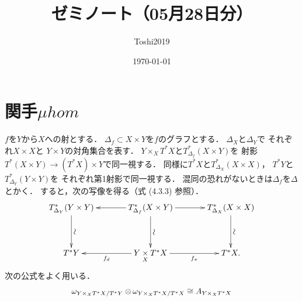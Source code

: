\documentclass[leqno, 10pt, a4paper, dvipdfmx]{jsarticle}
\title{ゼミノート（05月28日分）}
\author{Toshi2019}
\date{\today}
\theoremstyle{definition}
\numberwithin{equation}{section}
\newcommand{\tens}[1][]{\mathbin{\otimes_{\raise1.5ex\hbox to-.1em{}{#1}}}}
\newcommand{\pb}[1][]{\mathbin{\mathop{\times}\limits_{#1}}}
\theoremstyle{mystyle}
\newcommand{\mpb}[1][]{{#1}_{\pi}} %
\newcommand{\mdiff}[1][]{{#1}_{d}} %
\newcommand{\cotb}[1][]{T^{\ast}{#1}}
\newcommand{\muhom}{\mu hom}
\newcommand{\mucat}[2][]{\mathsf{D}^{\mathrm{b}}_{#1}(#2)}
\newcommand{\diag}[1][]{\Delta_{#1}}
\begin{document}
\maketitle
\tableofcontents

\section{関手\(\muhom\)}
\(f\)を\(Y\)から\(X\)への射とする．
\(\diag[f]\subset X\times Y\)を\(f\)のグラフとする．
\(\diag[X]\)と\(\diag[Y]\)で
それぞれ\(X\times X\)と
\(Y\times Y\)の対角集合を表す．
\(Y\mathbin{\times_{X}}\cotb[X]\)と\(T^{\ast}_{\diag[f]}(X\times Y)\)を
射影\(\cotb[(X\times Y)]\to(\cotb[X])\times Y\)で同一視する．
同様に\(\cotb[X]\)と\(T^{\ast}_{\diag[X]}(X\times X)\)，
\(\cotb[Y]\)と\(T^{\ast}_{\diag[Y]}(Y\times Y)\)を
それぞれ第1射影で同一視する．
混同の恐れがないときは\(\diag[f]\)を\(\diag\)とかく．
すると，次の写像を得る（式 (4.3.3) 参照）．
\begin{equation}\label{eq:4.4.1}
  \vcenter{\xymatrix@C=36pt@R=36pt{
    T^{\ast}_{\diag[Y]}(Y\times Y)
    \ar[d]^-{\rotatebox{90}{\(\sim\)}}
    &
    T^{\ast}_{\diag[f]}(X\times Y)
    \ar[d]^-{\rotatebox{90}{\(\sim\)}}
    \ar[l]
    \ar[r]
    &
    T^{\ast}_{\diag[X]}(X\times X)
    \ar[d]^-{\rotatebox{90}{\(\sim\)}}
    \\
    \cotb[Y]
    &
    Y\pb[X]\cotb[X]
    \ar[l]^-{\mdiff[f]}
    \ar[r]_-{\mpb[f]}
    &
    \cotb[X].
  }}
\end{equation}
次の公式をよく用いる．
\begin{equation}\label{eq:4.4.2}
  \omega_{{Y\mathbin{\times_{X}}\cotb[X]}\mathbin{/}\cotb[Y]}
  \tens[]
  \omega_{{Y\mathbin{\times_{X}}\cotb[X]}\mathbin{/}\cotb[X]}
  \cong
  A_{Y\mathbin{\times_{X}}\cotb[X]}
\end{equation}
\end{document}
